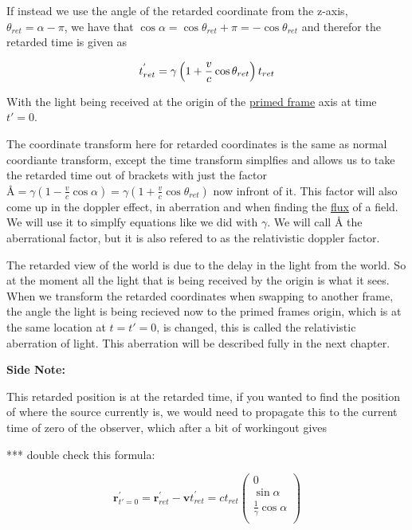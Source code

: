 If instead we use the angle of the retarded coordinate from the z-axis, $\theta_{ret} = \alpha - \pi$, we have that $\cos{\alpha}=\cos{\theta_{ret}+\pi}=-\cos{\theta_{ret}}$ and therefor the retarded time is given as

\begin{equation}
	\\ {{t}_{ret}^{'}} = {\gamma} \left(1 + \frac{v}{c} \cos{\theta_{ret}} \right) {{{t}_{ret}}}
\end{equation}

With the light being received at the origin of the \hyperlink{def-Primed-Frame}{primed frame} axis at time ${t{'}} = 0$.

The coordinate transform here for retarded coordinates is the same as normal coordiante transform, except the time transform simplfies and allows us to take the retarded time out of brackets with just the factor $\text{\AA}={\gamma} \left(1-\frac{v}{c} \cos{\alpha} \right) = {\gamma} \left(1 + \frac{v}{c} \cos{\theta_{ret}} \right)$ now infront of it.
This factor will also come up in the doppler effect, in aberration and when finding the \hyperlink{def-flux}{flux} of a field.
We will use it to simplfy equations like we did with $\gamma$.
We will call $\text{\AA}$ the aberrational factor, but it is also refered to as the relativistic doppler factor.

The retarded view of the world is due to the delay in the light from the world.
So at the moment all the light that is being received by the origin is what it sees.
When we transform the retarded coordinates when swapping to another frame, the angle the light is being recieved now to the primed frames origin, which is at the same location at ${t}={t{'}}=0$, is changed, this is called the relativistic aberration of light.
This aberration will be described fully in the next chapter.

\textbf{Side Note:}

This retarded position is at the retarded time, if you wanted to find the position of where the source currently is, we would need to propagate this to the current time of zero of the observer, which after a bit of workingout gives

*** double check this formula:

\begin{equation}
	\label{eq: primed position with synced times}
	\mathbf{r}_{{t{'}} = 0}^{'} = \mathbf{r}_{ret}^{'}-\mathbf{v}t_{ret}^{'} = {c}{{t}_{ret}}
	\begin{pmatrix}
		0                               \\
		\sin{\alpha}                    \\
		\frac{1}{{\gamma}} \cos{\alpha} \\
	\end{pmatrix}
\end{equation}


